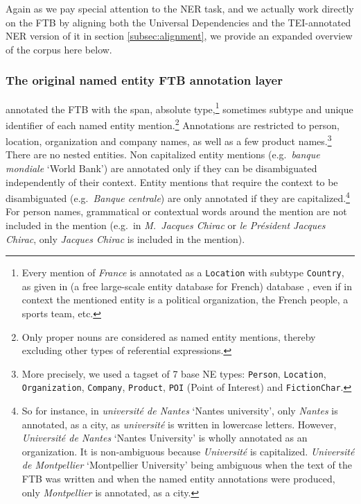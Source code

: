 Again as we pay special attention to the NER task, and we actually work directly on the FTB by aligning both the Universal Dependencies and the TEI-annotated NER version of it in section \ref{subsec:alignment}, we provide an expanded overview of the corpus here below.

\subsubsection{The original named entity FTB annotation layer}\label{ner-section}
\label{evalner}\label{subsec:originalannotations}

\citet{sagot-etal-2012-annotation} annotated the FTB with the span, absolute type,\footnote{Every mention of \emph{France} is annotated as a \texttt{Location} with subtype \texttt{Country}, as given in \aleda (a free large-scale entity database for French) database \citep{sagot-stern-2012-aleda}, even if in context the mentioned entity is a political organization, the French people, a sports team, etc.} sometimes subtype and \aleda unique identifier of each named entity mention.\footnote{Only proper nouns are considered as named entity mentions, thereby excluding other types of referential expressions.} Annotations are restricted to person, location, organization and company names, as well as a few product names.\footnote{More precisely, we used a tagset of 7 base NE types: \texttt{Person}, \texttt{Location}, \texttt{Organization}, \texttt{Company}, \texttt{Product}, \texttt{POI} (Point of Interest) and \texttt{FictionChar}.} There are no nested entities. Non capitalized entity mentions (e.g.~\emph{banque mondiale} `World Bank') are annotated only if they can be disambiguated independently of their context. Entity mentions that require the context to be disambiguated (e.g.~\emph{Banque centrale}) are only annotated if they are capitalized.\footnote{So for instance, in \emph{université de Nantes} `Nantes university', only \emph{Nantes} is annotated, as a city, as \emph{université} is written in lowercase letters. However, \emph{Université de Nantes} `Nantes University' is wholly annotated as an organization. It is non-ambiguous because \emph{Université} is capitalized. \emph{Université de Montpellier} `Montpellier University' being ambiguous when the text of the FTB was written and when the named entity annotations were produced, only \emph{Montpellier} is annotated, as a city.} For person names, grammatical or contextual words around the mention         are not included in the mention (e.g.~in \emph{M.~Jacques Chirac} or \emph{le Président Jacques Chirac}, only \emph{Jacques Chirac} is included in the mention).

